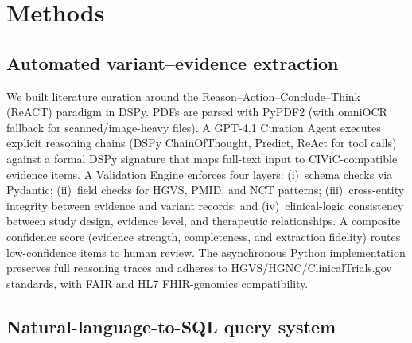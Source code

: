 % 
%
%

\section*{Methods}\label{sec:methods}


\subsection*{Automated variant--evidence extraction}

We built literature curation around the Reason--Action--Conclude--Think (ReACT) paradigm in DSPy. PDFs are parsed with PyPDF2 (with omniOCR fallback for scanned/image-heavy files). A GPT-4.1 Curation Agent executes explicit reasoning chains (DSPy ChainOfThought, Predict, ReAct for tool calls) against a formal DSPy signature that maps full-text input to CIViC-compatible evidence items. A Validation Engine enforces four layers: (i)~schema checks via Pydantic; (ii)~field checks for HGVS, PMID, and NCT patterns; (iii)~cross-entity integrity between evidence and variant records; and (iv)~clinical-logic consistency between study design, evidence level, and therapeutic relationships. A composite confidence score (evidence strength, completeness, and extraction fidelity) routes low-confidence items to human review. The asynchronous Python implementation preserves full reasoning traces and adheres to HGVS/HGNC/ClinicalTrials.gov standards, with FAIR and HL7 FHIR-genomics compatibility.


\subsection*{Natural-language-to-SQL query system}

